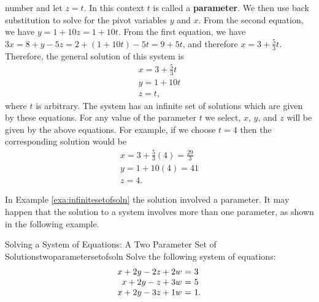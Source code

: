 \begin{solution}
  number and let $z = t$.  In this context $t$ is called a
  \textbf{parameter}. We then use back substitution
  to solve for the pivot variables $y$ and $x$. From the second
  equation, we have $y = 1+10z = 1+10t$. From the first equation, we
  have $3x = 8+y-5z = 2+(1+10t)-5t = 9+5t$, and therefore
  $x=3+\frac{5}{3}t$. Therefore, the general solution of this system
  is
  \[
    \begin{array}{l}
      x=3+\frac{5}{3}t \\
      y=1+10t \\
      z=t,
    \end{array}
  \]
  where $t$ is arbitrary. The system has an infinite set of solutions
  which are given by these equations. For any value of the parameter
  $t$ we select, $x$, $y$, and $z$ will be given by the above
  equations. For example, if we choose $t=4$ then the corresponding
  solution would be
  \[
    \begin{array}{l}
      x = 3 + \frac{5}{3}(4) = \frac{29}{3}\\
      y = 1+10(4) = 41 \\
      z = 4.
    \end{array}
  \]
\end{solution}

In Example \ref{exa:infinitesetofsoln} the solution involved a
parameter. It may happen that the solution to a system involves more
than one parameter, as shown in the following example.

\begin{example}{Solving a System of Equations: A Two Parameter Set of
    Solutions}{twoparametersetofsoln}
  Solve the following system of equations:
  \begin{equation*}
    \begin{array}{r@{~}c@{~}l}
      x +2y  -2z  +2w &=& 3 \\
      x +2y  -z   +3w &=& 5 \\
      x +2y  -3z  +1w &=& 1.
    \end{array}
  \end{equation*}
\end{example}

